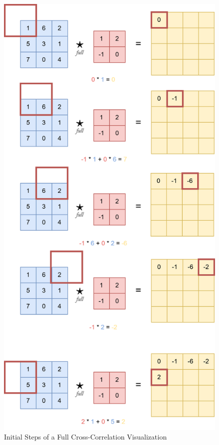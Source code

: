 \documentclass{article}
\begin{document}
    \begin{figure}[h]
        \centering
        \includegraphics[scale=0.275]{Full-Cross_Correlation-Algorithm.drawio.png}
        \caption{Initial Steps of a Full Cross-Correlation Visualization}
    \end{figure}
    
\end{document}
